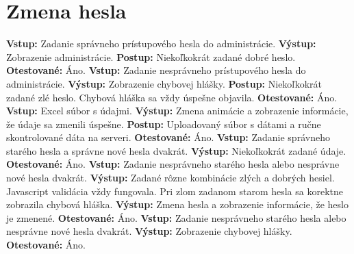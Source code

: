 \documentclass[12pt,a4paper]{report}
\begin{document}
\section[Zmena hesla alebo údajov]{\rmfamily\bfseries
	Zmena hesla}

\begin{flushleft}
\textbf{Vstup:} Zadanie správneho prístupového hesla do administrácie.\linebreak
\textbf{Výstup:} Zobrazenie administrácie.\linebreak
\textbf{Postup:} Niekoľkokrát zadané dobré heslo. \linebreak
\textbf{Otestované:} Áno.\linebreak
\linebreak
\textbf{Vstup:} Zadanie nesprávneho prístupového hesla do administrácie.\linebreak
\textbf{Výstup:} Zobrazenie chybovej hlášky.\linebreak
\textbf{Postup:} Niekoľkokrát zadané zlé heslo. Chybová hláška sa vždy úspešne objavila. \linebreak
\textbf{Otestované:} Áno.\linebreak
\linebreak
\textbf{Vstup:} Excel súbor s údajmi.\linebreak
\textbf{Výstup:} Zmena animácie a zobrazenie informácie, že údaje sa zmenili úspešne.\linebreak
\textbf{Postup:} Uploadovaný súbor s dátami a ručne skontrolované dáta na serveri. \linebreak
\textbf{Otestované:} Áno.\linebreak
\linebreak
\textbf{Vstup:} Zadanie správneho starého hesla a správne nové hesla dvakrát.\linebreak
\textbf{Výstup:} Niekoľkokrát zadané údaje.\linebreak
\textbf{Otestované:} Áno.\linebreak
\linebreak
\textbf{Vstup:} Zadanie nesprávneho starého hesla alebo nesprávne nové hesla dvakrát.\linebreak
\textbf{Výstup:} Zadané rôzne kombinácie zlých a dobrých hesiel. Javascript validácia vždy fungovala. Pri zlom zadanom starom hesla sa korektne zobrazila chybová hláška. \linebreak
\textbf{Výstup:} Zmena hesla a zobrazenie informácie, že heslo je zmenené.\linebreak
\textbf{Otestované:} Áno.\linebreak
\linebreak
\textbf{Vstup:} Zadanie nesprávneho starého hesla alebo nesprávne nové hesla dvakrát.\linebreak
\textbf{Výstup:} Zobrazenie chybovej hlášky.\linebreak
\textbf{Otestované:} Áno.\linebreak
\end{flushleft}
\end{document}
